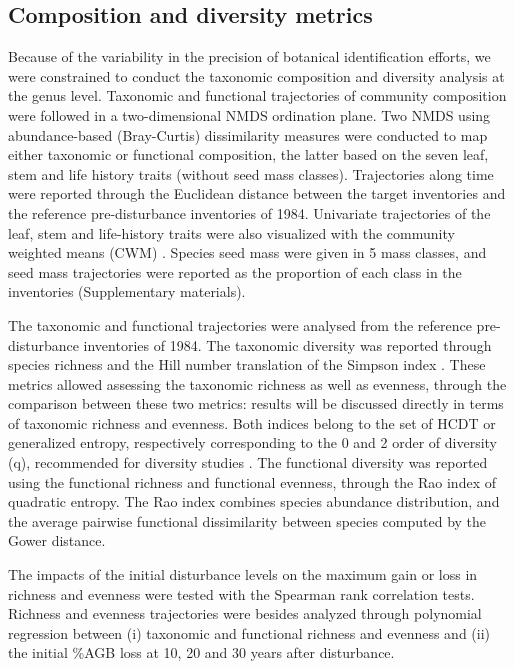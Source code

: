 \documentclass[fleqn,10pt]{ArtEcoFoG} %
\begin{document}
\subsection{Composition and diversity
metrics}\label{composition-and-diversity-metrics}

Because of the variability in the precision of botanical identification
efforts, we were constrained to conduct the taxonomic composition and
diversity analysis at the genus level. Taxonomic and functional
trajectories of community composition were followed in a two-dimensional
NMDS ordination plane. Two NMDS using abundance-based (Bray-Curtis)
dissimilarity measures were conducted to map either taxonomic or
functional composition, the latter based on the seven leaf, stem and
life history traits (without seed mass classes). Trajectories along time
were reported through the Euclidean distance between the target
inventories and the reference pre-disturbance inventories of 1984.
Univariate trajectories of the leaf, stem and life-history traits were
also visualized with the community weighted means (CWM)
\citep{Diaz2007}. Species seed mass were given in 5 mass classes, and
seed mass trajectories were reported as the proportion of each class in
the inventories (Supplementary materials).

The taxonomic and functional trajectories were analysed from the
reference pre-disturbance inventories of 1984. The taxonomic diversity
was reported through species richness and the Hill number translation of
the Simpson index \citep{Hill1973}. These metrics allowed assessing the
taxonomic richness as well as evenness, through the comparison between
these two metrics: results will be discussed directly in terms of
taxonomic richness and evenness. Both indices belong to the set of HCDT
or generalized entropy, respectively corresponding to the 0 and 2 order
of diversity (q), recommended for diversity studies \citep{Marcon2015}.
The functional diversity was reported using the functional richness and
functional evenness, through the Rao index of quadratic entropy. The Rao
index combines species abundance distribution, and the average pairwise
functional dissimilarity between species computed by the Gower distance.

The impacts of the initial disturbance levels on the maximum gain or
loss in richness and evenness were tested with the Spearman rank
correlation tests. Richness and evenness trajectories were besides
analyzed through polynomial regression between (i) taxonomic and
functional richness and evenness and (ii) the initial \%AGB loss at 10,
20 and 30 years after disturbance.
\end{document}
